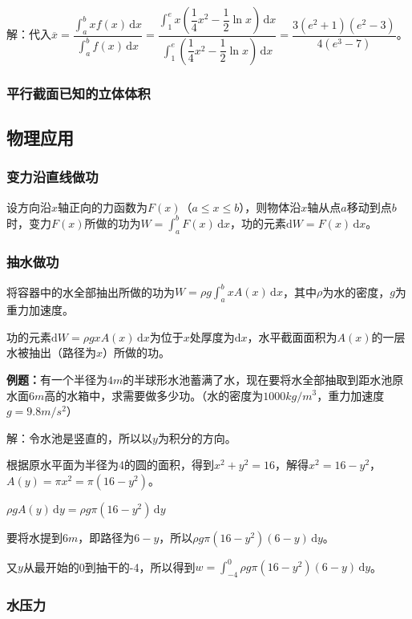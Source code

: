 \documentclass[UTF8, 12pt]{ctexart}
\begin{document}
解：代入$\overline{x}=\dfrac{\int_a^bxf(x)\,\textrm{d}x}{\int_a^bf(x)\,\textrm{d}x}=\dfrac{\int_1^ex\left(\dfrac{1}{4}x^2-\dfrac{1}{2}\ln x\right)\,\textrm{d}x}{\int_1^e\left(\dfrac{1}{4}x^2-\dfrac{1}{2}\ln x\right)\,\textrm{d}x}=\dfrac{3(e^2+1)(e^2-3)}{4(e^3-7)}$。

\subsubsection{平行截面已知的立体体积}

\subsection{物理应用}

\subsubsection{变力沿直线做功}

设方向沿$x$轴正向的力函数为$F(x)$（$a\leqslant x\leqslant b$），则物体沿$x$轴从点$a$移动到点$b$时，变力$F(x)$所做的功为$W=\int_a^bF(x)\,\textrm{d}x$，功的元素$\textrm{d}W=F(x)\,\textrm{d}x$。

\subsubsection{抽水做功}

将容器中的水全部抽出所做的功为$W=\rho g\int_a^bxA(x)\,\textrm{d}x$，其中$\rho$为水的密度，$g$为重力加速度。

功的元素$\textrm{d}W=\rho gxA(x)\,\textrm{d}x$为位于$x$处厚度为$\textrm{d}x$，水平截面面积为$A(x)$的一层水被抽出（路径为$x$）所做的功。

\textbf{例题：}有一个半径为$4m$的半球形水池蓄满了水，现在要将水全部抽取到距水池原水面$6m$高的水箱中，求需要做多少功。（水的密度为$1000kg/m^3$，重力加速度$g=9.8m/s^2$）

解：令水池是竖直的，所以以$y$为积分的方向。

根据原水平面为半径为4的圆的面积，得到$x^2+y^2=16$，解得$x^2=16-y^2$，$A(y)=\pi x^2=\pi(16-y^2)$。

$\rho gA(y)\,\textrm{d}y=\rho g\pi(16-y^2)\,\textrm{d}y$

要将水提到$6m$，即路径为$6-y$，所以$\rho g\pi(16-y^2)(6-y)\,\textrm{d}y$。

又$y$从最开始的0到抽干的-4，所以得到$w=\int_{-4}^0\rho g\pi(16-y^2)(6-y)\,\textrm{d}y$。

\subsubsection{水压力}
\end{document}
